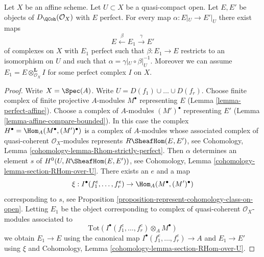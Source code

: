 \begin{lemma}
\label{lemma-lift-map}
Let $X$ be an affine scheme. Let $U \subset X$ be a quasi-compact open.
Let $E, E'$ be objects of $D_\QCoh(\mathcal{O}_X)$ with $E$ perfect.
For every map $\alpha : E|_U \to E'|_U$ there exist maps
$$
E \xleftarrow{\beta} E_1 \xrightarrow{\gamma} E'
$$
of complexes on $X$ with $E_1$ perfect such that $\beta : E_1 \to E$
restricts to an isomorphism on $U$ and such that
$\alpha = \gamma|_U \circ \beta|_U^{-1}$.
Moreover we can assume $E_1 = E \otimes_{\mathcal{O}_X}^\mathbf{L} I$
for some perfect complex $I$ on $X$.
\end{lemma}

\begin{proof}
Write $X = \Spec(A)$. Write $U = D(f_1) \cup \ldots \cup D(f_r)$. Choose
finite complex of finite projective $A$-modules $M^\bullet$ representing
$E$ (Lemma \ref{lemma-perfect-affine}). Choose a complex of $A$-modules
$(M')^\bullet$ representing $E'$ (Lemma \ref{lemma-affine-compare-bounded}).
In this case the complex $H^\bullet = \Hom_A(M^\bullet, (M')^\bullet)$
is a complex of $A$-modules whose associated complex of quasi-coherent
$\mathcal{O}_X$-modules represents $R\SheafHom(E, E')$, see
Cohomology, Lemma \ref{cohomology-lemma-Rhom-strictly-perfect}.
Then $\alpha$ determines an element $s$ of $H^0(U, R\SheafHom(E, E'))$, see
Cohomology, Lemma \ref{cohomology-lemma-section-RHom-over-U}.
There exists an $e$ and a map
$$
\xi : I^\bullet(f_1^e, \ldots, f_r^e) \to \Hom_A(M^\bullet, (M')^\bullet)
$$
corresponding to $s$, see
Proposition \ref{proposition-represent-cohomology-class-on-open}.
Letting $E_1$ be the object corresponding to
complex of quasi-coherent $\mathcal{O}_X$-modules
associated to
$$
\text{Tot}(I^\bullet(f_1^e, \ldots, f_r^e) \otimes_A M^\bullet)
$$
we obtain $E_1 \to E$ using the canonical map
$I^\bullet(f_1^e, \ldots, f_r^e) \to A$ and $E_1 \to E'$
using $\xi$ and
Cohomology, Lemma \ref{cohomology-lemma-section-RHom-over-U}.
\end{proof}
